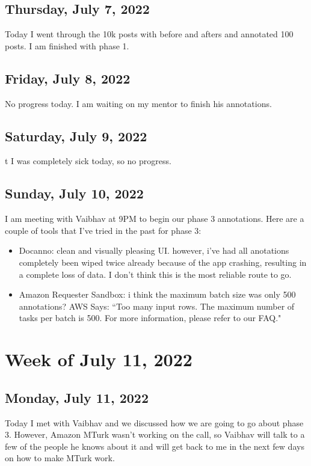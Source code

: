 \documentclass[11pt,letterpaper]{article}
\begin{document}
\subsection{Thursday, July 7, 2022}
Today I went through the 10k posts with before and afters and annotated 100 posts. I am finished with phase 1.

\subsection{Friday, July 8, 2022}
No progress today. I am waiting on my mentor to finish his annotations.

\subsection{Saturday, July 9, 2022}t
I was completely sick today, so no progress.

\subsection{Sunday, July 10, 2022}
I am meeting with Vaibhav at 9PM to begin our phase 3 annotations. Here are a couple of tools that I've tried in the past for phase 3:

\begin{itemize}
    \item Docanno: clean and visually pleasing UI. however, i've had all anotations completely been wiped twice already because of the app crashing, resulting in a complete loss of data. I don't think this is the most reliable route to go.
    \item Amazon Requester Sandbox: i think the maximum batch size was only 500 annotations? AWS Says: ``Too many input rows. The maximum number of tasks per batch is 500. For more information, please refer to our FAQ."
\end{itemize}

\section{Week of July 11, 2022}

\subsection{Monday, July 11, 2022}
Today I met with Vaibhav and we discussed how we are going to go about phase 3. However, Amazon MTurk wasn't working on the call, so Vaibhav will talk to a few of the people he knows about it and will get back to me in the next few days on how to make MTurk work. 
\end{document}
